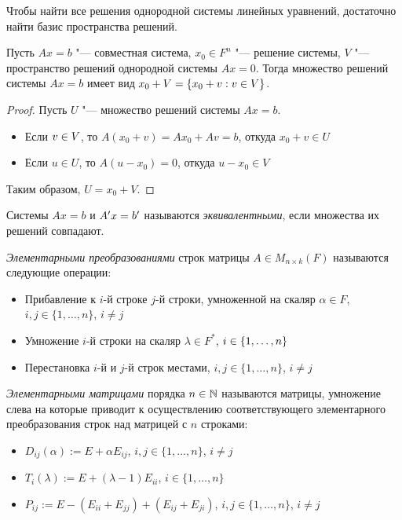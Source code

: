 \begin{note}
	Чтобы найти все решения однородной системы линейных уравнений, достаточно найти базис пространства решений.
\end{note}

\begin{proposition}
	Пусть $Ax = b$ "--- совместная система, $x_0 \in F^n$ "--- решение системы, $V$ "--- пространство решений однородной системы $Ax = 0$. Тогда множество решений системы $Ax = b$ имеет вид $x_0 + V \hm{=} \{x_0 + v: v \in V\}$.
\end{proposition}

\begin{proof}
	Пусть $U$ "--- множество решений системы $Ax = b$.
	\begin{itemize}
		\item Если $v \hm{\in} V$, то $A(x_0 + v) = Ax_0 + Av = b$, откуда $x_0 + v \in U$
		\item Если $u \in U$, то $A(u - x_0) = 0$, откуда $u - x_0 \in V$
	\end{itemize}

	Таким образом, $U = x_0 + V$.
\end{proof}

\begin{definition}
	Системы $Ax = b$ и $A'x\hm{=}b'$ называются \textit{эквивалентными}, если множества их решений совпадают.
\end{definition}

\begin{definition}
	\textit{Элементарными преобразованиями} строк матрицы $A \in M_{n \times k}(F)$ называются следующие операции:
	\begin{itemize}
		\item Прибавление к $i$-й строке $j$-й строки, умноженной на скаляр $\alpha \in F$, $i, j \in \{1, \dotsc, n\}$, $i \ne j$
		\item Умножение $i$-й строки на скаляр $\lambda \in F^*$, $i \in \{1, \dotsc, n\}$
		\item Перестановка $i$-й и $j$-й строк местами, $i, j \in \{1, \dotsc, n\}$, $i \ne j$
	\end{itemize}
\end{definition}

\begin{definition}
	\textit{Элементарными матрицами} порядка $n \in \mathbb{N}$ называются матрицы, умножение слева
	на которые приводит к осуществлению соответствующего элементарного преобразования строк над матрицей с $n$ строками:
	\begin{itemize}
		\item $D_{ij}(\alpha) := E + \alpha E_{ij}$, $i, j \in \{1, \dotsc, n\}$, $i \ne j$
		\item $T_{i}(\lambda) := E + (\lambda - 1) E_{ii}$, $i \in \{1, \dotsc, n\}$
		\item $P_{ij} := E - (E_{ii} + E_{jj}) + (E_{ij} + E_{ji})$, $i, j \in \{1, \dotsc, n\}$, $i \ne j$
	\end{itemize}
\end{definition}

